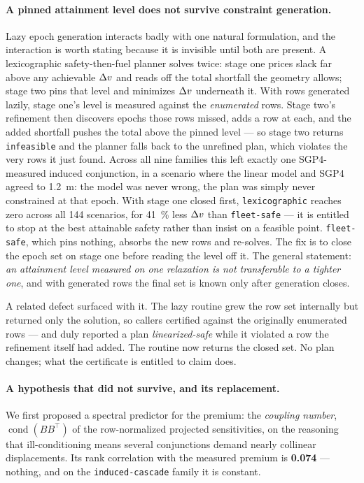 \paragraph{A pinned attainment level does not survive constraint generation.}
Lazy epoch generation interacts badly with one natural formulation, and the
interaction is worth stating because it is invisible until both are present.
A lexicographic safety-then-fuel planner solves twice: stage one prices slack
far above any achievable $\Delta v$ and reads off the total shortfall the geometry
allows; stage two pins that level and minimizes $\Delta v$ underneath it. With rows
generated lazily, stage one's level is measured against the \emph{enumerated}
rows. Stage two's refinement then discovers epochs those rows missed, adds a
row at each, and the added shortfall pushes the total above the pinned
level --- so stage two returns \texttt{infeasible} and the planner falls back
to the unrefined plan, which violates the very rows it just found. Across all
nine families this left exactly one SGP4-measured induced conjunction, in a
scenario where the linear model and SGP4 agreed to \SI{1.2}{\meter}: the model
was never wrong, the plan was simply never constrained at that epoch.
With stage one closed first, \texttt{lexicographic} reaches zero across all
144 scenarios, for \SI{41}{\percent} less $\Delta v$ than
\texttt{fleet-safe} --- it is entitled to stop at the best attainable safety
rather than insist on a feasible point.
\texttt{fleet-safe}, which pins nothing, absorbs the new rows and re-solves.
The fix is to close the epoch set on stage one before reading the level off it.
The general statement: \emph{an attainment level measured on one relaxation is
not transferable to a tighter one}, and with generated rows the final set is
known only after generation closes.

A related defect surfaced with it. The lazy routine grew the row set
internally but returned only the solution, so callers certified against the
originally enumerated rows --- and duly reported a plan
\emph{linearized-safe} while it violated a row the refinement itself had
added. The routine now returns the closed set. No plan changes; what the
certificate is entitled to claim does.

\paragraph{A hypothesis that did not survive, and its replacement.} We first
proposed a spectral predictor for the premium: the \emph{coupling number},
$\operatorname{cond}(BB^{\!\top})$ of the row-normalized projected
sensitivities, on the reasoning that ill-conditioning means several
conjunctions demand nearly collinear displacements. Its rank correlation with
the measured premium is \textbf{\num{0.074}} --- nothing, and on the
\texttt{induced-cascade} family it is constant.

